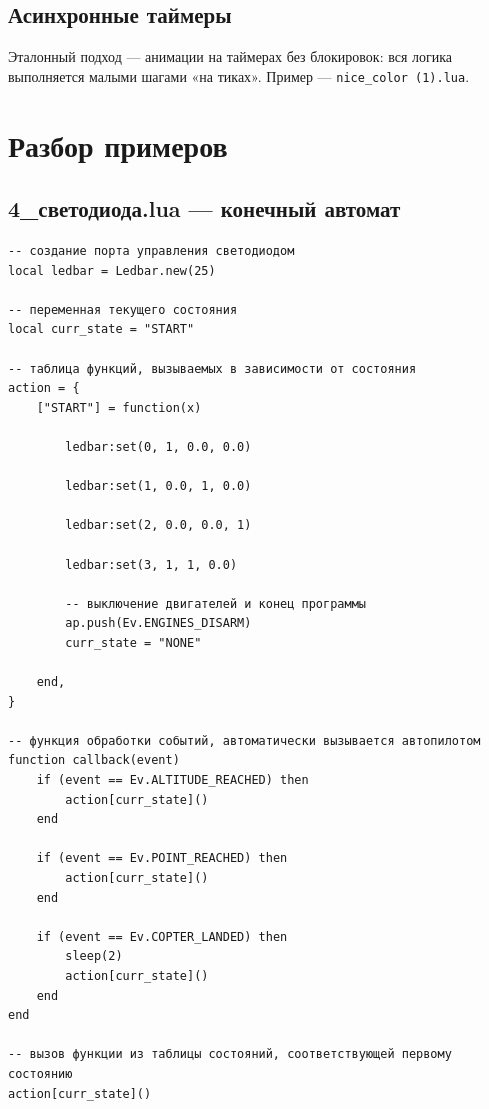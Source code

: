 \documentclass[a4paper,12pt]{article}
\begin{document}
\subsection{Асинхронные таймеры}
Эталонный подход — анимации на таймерах без блокировок: вся логика выполняется малыми шагами «на тиках». Пример — \verb|nice_color (1).lua|.

\section{Разбор примеров}
\subsection{4\_светодиода.lua — конечный автомат}
\begin{lstlisting}[style=lua,caption={4_светодиода.lua}]
-- создание порта управления светодиодом
local ledbar = Ledbar.new(25)

-- переменная текущего состояния
local curr_state = "START"

-- таблица функций, вызываемых в зависимости от состояния
action = {
	["START"] = function(x)

		ledbar:set(0, 1, 0.0, 0.0)

		ledbar:set(1, 0.0, 1, 0.0)

		ledbar:set(2, 0.0, 0.0, 1)

		ledbar:set(3, 1, 1, 0.0)

		-- выключение двигателей и конец программы
		ap.push(Ev.ENGINES_DISARM)
		curr_state = "NONE"

	end,
}

-- функция обработки событий, автоматически вызывается автопилотом
function callback(event)
	if (event == Ev.ALTITUDE_REACHED) then
		action[curr_state]()
	end

	if (event == Ev.POINT_REACHED) then
		action[curr_state]()
	end

	if (event == Ev.COPTER_LANDED) then
		sleep(2)
		action[curr_state]()
	end
end

-- вызов функции из таблицы состояний, соответствующей первому состоянию
action[curr_state]()
\end{lstlisting}
\end{document}
